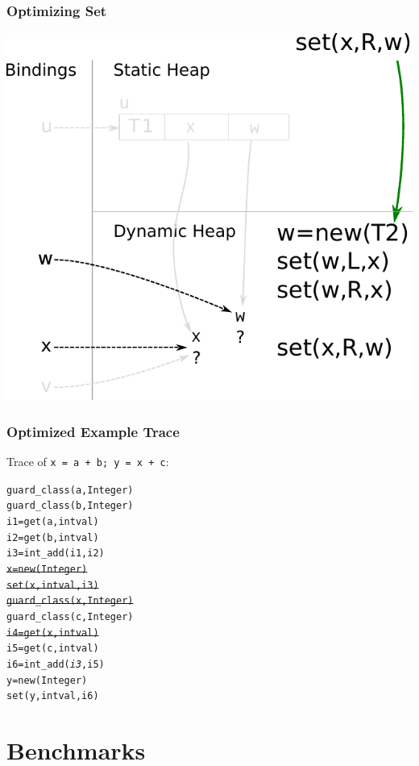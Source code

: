 \documentclass[utf8x]{beamer}
\begin{document}
\begin{frame}[plain]
  \frametitle{Optimizing Set}
  \includegraphics[scale=0.8]{figures/opt_set_dynamic2}
\end{frame}

\begin{frame}[containsverbatim]
  \frametitle{Optimized Example Trace}
  Trace of \texttt{x = a + b; y = x + c}:
\begin{alltt}
guard_class(a, Integer)
guard_class(b, Integer)
i1 = get(a, intval)
i2 = get(b, intval)
i3 = int_add(i1, i2)
\sout{x = new(Integer)}
\sout{set(x, intval, i3)}
\sout{guard_class(x, Integer)}
guard_class(c, Integer)
\sout{i4 = get(x, intval)}
i5 = get(c, intval)
i6 = int_add(\emph{i3}, i5)
y = new(Integer)
set(y, intval, i6)
\end{alltt}
\end{frame}

\section{Benchmarks}
\end{document}
